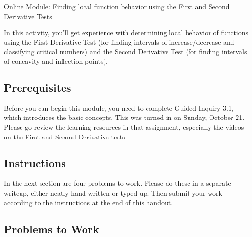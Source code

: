 \documentclass[11pt]{article}
\begin{document}
\begin{center}
    \Large{Online Module: Finding local function behavior using the First and Second Derivative Tests}
\end{center}

\noindent
In this activity, you'll get experience with determining local behavior of functions using the First Derivative Test (for finding intervals of increase/decrease and classifying critical numbers) and the Second Derivative Test (for finding intervals of concavity and inflection points). 

\subsection*{Prerequisites}

Before you can begin this module, you need to complete Guided Inquiry 3.1, which introduces the basic concepts. This was turned in on Sunday, October 21. Please go review the learning resources in that assignment, especially the videos on the First and Second Derivative tests. 

\subsection*{Instructions}

In the next section are four problems to work. Please do these in a separate writeup, either neatly hand-written or typed up. Then submit your work according to the instructions at the end of this handout. 


\subsection*{Problems to Work}
    
\end{document}
